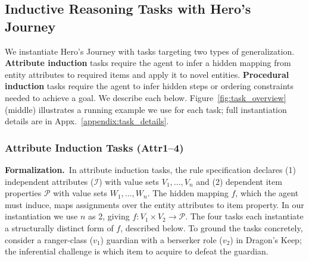 \documentclass[11pt]{article}
\newcommand{\AS}{{\sc Hero's Journey}\xspace}
\begin{document}

\subsection{Inductive Reasoning Tasks with \AS}
We instantiate \AS with tasks targeting two types of generalization. \textbf{Attribute induction} tasks require the agent to infer a hidden mapping from entity attributes to required items and apply it to novel entities. \textbf{Procedural induction} tasks require the agent to infer hidden steps or ordering constraints needed to achieve a goal. We describe each below. Figure~\ref{fig:task_overview} (middle) illustrates a running example we use for each task; full instantiation details are in Appx.~\ref{appendix:task_details}.

\subsubsection{Attribute Induction Tasks (Attr1--4)}
\label{attribute induction}
\noindent\textbf{Formalization.}~In attribute induction tasks, the rule specification declares (1) independent attributes ($\mathcal{I}$) with value sets $V_1, \ldots, V_n$ and (2) dependent item properties $\mathcal{P}$ with value sets $W_1, \ldots, W_n$. The hidden mapping $f$, which the agent must induce, maps assignments over the entity attributes to item property. In our instantiation we use $n$ as 2, giving $f: V_1 \times V_2 \to \mathcal{P}$. The four tasks each instantiate a structurally distinct form of $f$, described below. To ground the tasks concretely, consider a ranger-class ($v_1$) guardian with a berserker role ($v_2$) in Dragon's Keep; the inferential challenge is which item to acquire to defeat the guardian.
\end{document}

